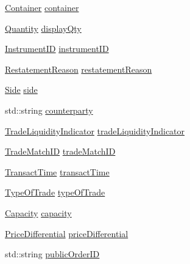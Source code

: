 \begin{DoxyCompactItemize}
\item 
\hyperlink{namespaceMetal_1_1LSE_ad218510a226f263117710c146016b65b}{Container} \hyperlink{classMetal_1_1LSE_1_1ExecutionReport_afcbe79b4641ebdacbcc696a0d9f7a15a}{container}
\item 
\hyperlink{namespaceMetal_1_1LSE_a86342859fb8034a9649f6d789e97d9da}{Quantity} \hyperlink{classMetal_1_1LSE_1_1ExecutionReport_aae88e278d6a066fc741244ecf9f3ab9d}{display\+Qty}
\item 
\hyperlink{namespaceMetal_1_1LSE_a5280aa41aaa4433df351e733a23ecd14}{Instrument\+I\+D} \hyperlink{classMetal_1_1LSE_1_1ExecutionReport_a18b6d033fd5a94eb6279e1811d11bce9}{instrument\+I\+D}
\item 
\hyperlink{namespaceMetal_1_1LSE_a16935327b8c86efab5ac513a640e8e85}{Restatement\+Reason} \hyperlink{classMetal_1_1LSE_1_1ExecutionReport_a7bf14d524b6b1907bed17d8237e2d945}{restatement\+Reason}
\item 
\hyperlink{namespaceMetal_1_1LSE_af5236b7a999484d8cd5b579b7d7c133b}{Side} \hyperlink{classMetal_1_1LSE_1_1ExecutionReport_a14730831f5ffe625169c09f00c8ae0db}{side}
\item 
std\+::string \hyperlink{classMetal_1_1LSE_1_1ExecutionReport_a89f5bdb1724a80202c89f90ca38d1429}{counterparty}
\item 
\hyperlink{namespaceMetal_1_1LSE_a2230716d38d6562a96dd1b7a53f04c8a}{Trade\+Liquidity\+Indicator} \hyperlink{classMetal_1_1LSE_1_1ExecutionReport_a91963fe4cac5a89e43b6c3e1e5d241a2}{trade\+Liquidity\+Indicator}
\item 
\hyperlink{namespaceMetal_1_1LSE_a9026616462e8f8b2d1b41935d63b1f77}{Trade\+Match\+I\+D} \hyperlink{classMetal_1_1LSE_1_1ExecutionReport_af1a9f56e131ce7a40e4b9789e35f76a7}{trade\+Match\+I\+D}
\item 
\hyperlink{namespaceMetal_1_1LSE_a4f27043d4f3897c99c960b89b5fe8ddb}{Transact\+Time} \hyperlink{classMetal_1_1LSE_1_1ExecutionReport_af53286cedfca6d09c3f4b3a138468861}{transact\+Time}
\item 
\hyperlink{namespaceMetal_1_1LSE_ae826e079e4b4ee205481709e1436a672}{Type\+Of\+Trade} \hyperlink{classMetal_1_1LSE_1_1ExecutionReport_ac792bd8a4c7af225d31b726b3c8c02af}{type\+Of\+Trade}
\item 
\hyperlink{namespaceMetal_1_1LSE_aff7400475e278748e213fefa47bb9b99}{Capacity} \hyperlink{classMetal_1_1LSE_1_1ExecutionReport_ad39330f05bdb249538c67baafa090b17}{capacity}
\item 
\hyperlink{namespaceMetal_1_1LSE_a43d1d8f30663383025e28ce3ca39a19c}{Price\+Differential} \hyperlink{classMetal_1_1LSE_1_1ExecutionReport_aeab170d67c9cc841d12d2888dc42b2d2}{price\+Differential}
\item 
std\+::string \hyperlink{classMetal_1_1LSE_1_1ExecutionReport_ad70be9d164c7b2a61335749efd20626e}{public\+Order\+I\+D}
\end{DoxyCompactItemize}
